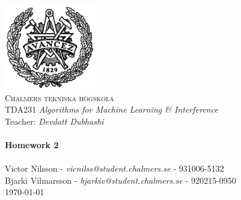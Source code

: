 
\begin{titlepage}
\begin{center}


~\\[1.0cm]
 \includegraphics[width=0.3\textwidth]{Figures/chalmers.png}~\\[1.0cm]

\textsc{\LARGE Chalmers tekniska högskola}\\[0.3cm]
TDA231 \textit{Algorithms for Machine Learning \& Interference}\\
Teacher: \textit{Devdatt Dubhashi} \\

\HRule \\[0.3cm]
{ \huge \bfseries Homework 2 \\[0.3cm] }
\HRule \\[0.3cm]

Victor Nilsson  -  \textit{vicnilss@student.chalmers.se} - 931006-5132\\ [0.3cm]
Bjarki Vilmarsson  -  \textit{bjarkiv@student.chalmers.se} - 920215-0950\\ [0.3cm]


\vfill
{\large \today}

\end{center}
\end{titlepage}

\newpage